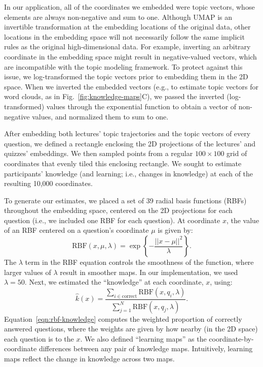 \documentclass[10pt]{article}
\begin{document}
In our application, all of the coordinates we embedded were topic vectors,
whose elements are always non-negative and sum to one. Although UMAP is an
invertible transformation at the embedding locations of the original data,
other locations in the embedding space will not necessarily follow the same
implicit rules as the original high-dimensional data. For example,
inverting an arbitrary coordinate in the embedding space might result in
negative-valued vectors, which are incompatible with the topic modeling
framework. To protect against this issue, we log-transformed the topic vectors
prior to embedding them in the 2D space. When we inverted the embedded vectors
(e.g., to estimate topic vectors for word clouds, as in
Fig.~\ref{fig:knowledge-maps}C), we passed the inverted (log-transformed)
values through the exponential function to obtain a vector of non-negative
values, and normalized them to sum to one.

After embedding both lectures' topic trajectories and the topic vectors of
every question, we defined a rectangle enclosing the 2D projections of the
lectures' and quizzes' embeddings. We then sampled points from a regular $100
\times 100$ grid of coordinates that evenly tiled this enclosing rectangle. We
sought to estimate participants' knowledge (and learning; i.e., changes in
knowledge) at each of the resulting 10,000 coordinates.

To generate our estimates, we placed a set of 39 radial basis functions (RBFs)
throughout the embedding space, centered on the 2D projections for each
question (i.e., we included one RBF for each question). At coordinate $x$, the
value of an RBF centered on a question's coordinate $\mu$ is given by:
\begin{equation}
    \mathrm{RBF}(x, \mu, \lambda) = \exp\left\{-\frac{||x - \mu||^2}{\lambda}\right\}.
    \label{eqn:rbf}
\end{equation}
The $\lambda$ term in the RBF equation controls the smoothness of the
function, where larger values of $\lambda$ result in smoother maps. In our
implementation, we used $\lambda = 50$.  Next, we estimated the ``knowledge''
at each coordinate, $x$, using:
\begin{equation}
    \hat{k}(x) = \frac{\sum_{i \in \mathrm{correct}} \mathrm{RBF}(x, q_i, \lambda)}{\sum_{j = 1}^N \mathrm{RBF}(x, q_j, \lambda)}.
    \label{eqn:rbf-knowledge}
\end{equation}
Equation~\ref{eqn:rbf-knowledge} computes the weighted proportion of correctly
answered questions, where the weights are given by how nearby (in the 2D space)
each question is to the $x$. We also defined ``learning maps'' as the
coordinate-by-coordinate differences between any pair of knowledge maps.
Intuitively, learning maps reflect the change in knowledge
across two maps.
\end{document}
